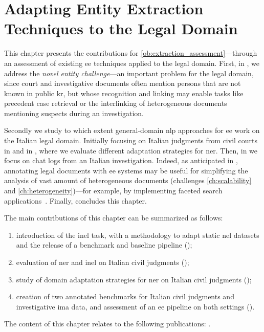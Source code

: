 \chapter[Adapting Entity Extraction Techniques to the Legal Domain][Adapting EE to Legal Domain]{Adapting Entity Extraction Techniques to the Legal Domain}
\label{chap:extraction}


This chapter presents the contributions for \ref{ob:extraction_assessment}---through an assessment of existing \acf{ee} techniques applied to the legal domain.
First, in , we address the \emph{novel entity challenge}---an important problem for the legal domain, since court and investigative documents often mention persons that are not known in public \acl{kr}, but whose recognition and linking may enable tasks like precedent case retrieval or the interlinking of heterogeneous documents mentioning suspects during an investigation.

Secondly we study to which extent general-domain \ac{nlp} approaches for \acl{ee} work on the Italian legal domain.
Initially focusing on Italian judgments from civil courts in  and in , where we evaluate different adaptation strategies for \acl{ner}. Then, in  we focus on chat logs from an Italian investigation. Indeed, as anticipated in , annotating legal documents with \ac{ee} systems may be useful for simplifying the analysis of vast amount of heterogeneous documents (challenges \ref{ch:scalability} and \ref{ch:heterogeneity})---for example, by implementing faceted search applications~\cite{ARMENTANO2014_nlp_faceted,hearst_2006_faceted}.
Finally,  concludes this chapter.

The main contributions of this chapter can be summarized as follows:
\begin{enumerate}
    \item introduction of the \acf{inel} task, with a methodology to adapt static \acf{nel} datasets and the release of a benchmark and baseline pipeline ();
    \item evaluation of \acf{ner} and \acl{inel} on Italian civil judgments ();
    \item study of domain adaptation strategies for \ac{ner} on Italian civil judgments ();
    \item creation of two annotated benchmarks for Italian civil judgments and investigative \acf{ima} data, and assessment of an \acl{ee} pipeline on both settings ().
\end{enumerate}



The content of this chapter relates to the following publications: \textcite{ijckg2022,BELLANDI2024,aixia_2023,pozzi_wise_2025}.


